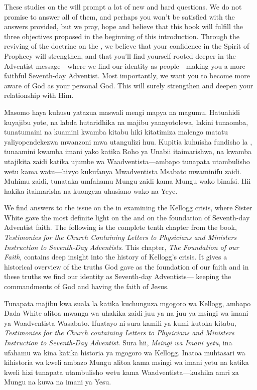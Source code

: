These studies on the  will prompt a lot of new and hard questions. We do not promise to answer all of them, and perhaps you won’t be satisfied with the answers provided, but we pray, hope and believe that this book will fulfill the three objectives proposed in the beginning of this introduction. Through the reviving of the doctrine on the , we believe that your confidence in the Spirit of Prophecy will strengthen, and that you’ll find yourself rooted deeper in the Adventist message—where we find our identity as people—making you a more faithful Seventh-day Adventist. Most importantly, we want you to become more aware of God as your personal God. This will surely strengthen and deepen your relationship with Him.


Masomo haya kuhusu  yatazua maswali mengi mapya na magumu. Hatuahidi kuyajibu yote, na labda hutaridhika na majibu yanayotolewa, lakini tunaomba, tunatumaini na kuamini kwamba kitabu hiki kitatimiza malengo matatu yaliyopendekezwa mwanzoni mwa utangulizi huu. Kupitia kuhuisha fundisho la , tunaamini kwamba imani yako katika Roho ya Unabii itaimarishwa, na kwamba utajikita zaidi katika ujumbe wa Waadventista—ambapo tunapata utambulisho wetu kama watu—hivyo kukufanya Mwadventista Msabato mwaminifu zaidi. Muhimu zaidi, tunataka umfahamu Mungu zaidi kama Mungu wako binafsi. Hii hakika itaimarisha na kuongeza uhusiano wako na Yeye.


We find answers to the issue on the  in examining the Kellogg crisis, where Sister White gave the most definite light on the  and on the foundation of Seventh-day Adventist faith. The following is the complete tenth chapter from the book, \textit{Testimonies for the Church Containing Letters to Physicians and Ministers Instruction to Seventh-Day Adventists}. This chapter, \textit{The Foundation of our Faith}, contains deep insight into the history of Kellogg’s crisis. It gives a historical overview of the truths God gave as the foundation of our faith and in these truths we find our identity as Seventh-day Adventists— keeping the commandments of God and having the faith of Jesus.


Tunapata majibu kwa suala la  katika kuchunguza mgogoro wa Kellogg, ambapo Dada White alitoa mwanga wa uhakika zaidi juu ya  na juu ya msingi wa imani ya Waadventista Wasabato. Ifuatayo ni sura kamili ya kumi kutoka kitabu, \textit{Testimonies for the Church containing Letters to Physicians and Ministers Instruction to Seventh-Day Adventist}. Sura hii, \textit{Msingi wa Imani yetu}, ina ufahamu wa kina katika historia ya mgogoro wa Kellogg. Inatoa muhtasari wa kihistoria wa kweli ambazo Mungu alitoa kama msingi wa imani yetu na katika kweli hizi tunapata utambulisho wetu kama Waadventista—kushika amri za Mungu na kuwa na imani ya Yesu.
